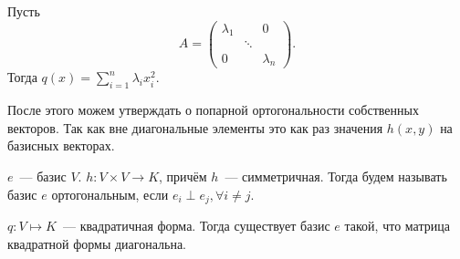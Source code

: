 \begin{statement}
    Пусть 
     \[
         A = 
         \begin{pmatrix}
             \lambda_ 1 & & 0 \\
            & \ddots & \\
            0& & \lambda_n
         \end{pmatrix}
    .\] 
    Тогда $q(x) = \sum\limits_{i=1}^{n}{\lambda_i x_i^2}$.

    После этого можем утверждать о попарной ортогональности собственных векторов.
    Так как вне диагональные элементы это как раз значения $h(x,y)$ на базисных векторах.
\end{statement}
\begin{definition}
    $e$~--- базис $V$. $h\colon V\times V\rightarrow K$, причём $h$~--- симметричная.
    Тогда будем называть базис  $e$ ортогональным, если $e_i\perp e_j, \forall i\not=j$.
\end{definition}
\begin{theorem}
    $q\colon V \mapsto K$~--- квадратичная форма. Тогда существует базис $e$ такой, что
    матрица квадратной формы диагональна.
\end{theorem}
